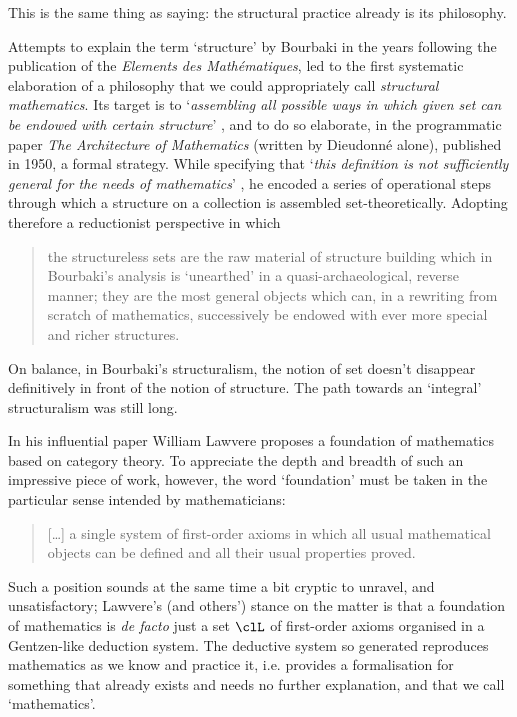 This is the same thing as saying: the structural practice already is its philosophy.

Attempts to explain the term `structure' by Bourbaki in the years following the publication of the \textit{Elements des Mathématiques}, led to the first systematic elaboration of a philosophy that we could appropriately call \textit{structural mathematics}. Its target is to `\textit{assembling all possible ways in which given set can be endowed with certain structure}' \cite{kromer2007tool}, and to do so elaborate, in the programmatic paper \textit{The Architecture of Mathematics} (written by Dieudonné alone), published in 1950, a formal strategy. While specifying that `\textit{this definition is not sufficiently general for the needs of mathematics}' \cite{Bourb50}, he encoded a series of operational steps through which a structure on a collection is assembled set-theoretically. Adopting therefore a reductionist perspective in which
\begin{quote}
    the structureless sets are the raw material of structure building which in Bourbaki’s analysis is `unearthed' in a quasi-archaeological, reverse manner; they are the most general objects which can, in a rewriting from scratch of mathematics, successively be endowed with ever more special and richer structures.\hfill  \cite{kromer2007tool}
\end{quote}
On balance, in Bourbaki's structuralism, the notion of set doesn't disappear definitively in front of the notion of structure. The path towards an `integral' structuralism was still long.

In his influential paper \cite{lajolla} William Lawvere proposes a foundation of mathematics based on category theory. To appreciate the depth and breadth of such an impressive piece of work, however, the word `foundation' must be taken in the particular sense intended by mathematicians:
\begin{quote}
    [\dots\unkern] a single system of first-order axioms in which all usual mathematical objects can be defined and all their usual properties proved.
\end{quote}
Such a position sounds at the same time a bit cryptic to unravel, and unsatisfactory; Lawvere's (and others') stance on the matter is that a foundation of mathematics is \emph{de facto} just a set $\clL$ of first-order axioms organised in a Gentzen-like deduction system. The deductive system so generated reproduces mathematics as we know and practice it, i.e. provides a formalisation for something that already exists and needs no further explanation, and that we call `mathematics'.

